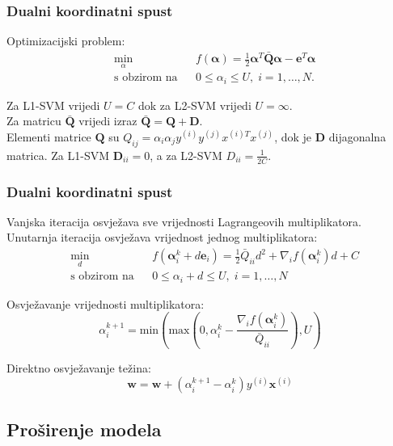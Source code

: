\documentclass[utf8]{beamer}
\newcommand{\iteralpha}{\boldsymbol{\alpha}_i^{k}}
\begin{document}
\begin{frame}
\frametitle{Dualni koordinatni spust}
Optimizacijski problem:
\begin{equation*}
\begin{aligned}
& \underset{\alpha}{\text{min}}
& & f(\boldsymbol{\alpha}) = \frac{1}{2}\boldsymbol{\alpha}^T\bar{\textbf{Q}}\boldsymbol{\alpha} 
- \textbf{e}^T\boldsymbol{\alpha}\\
& \text{s obzirom na}
& & 0 \leq \alpha_i \leq U, \; i = 1, \ldots, N.
\end{aligned}
\end{equation*}

Za L1-SVM vrijedi $U=C$ dok za L2-SVM vrijedi $U=\infty$. \\
Za matricu $\bar{\textbf{Q}}$ vrijedi izraz $\bar{\textbf{Q}} = \textbf{Q} + \textbf{D}$.\\
Elementi matrice $\textbf{Q}$ su $Q_{ij} = \alpha_i\alpha_jy^{(i)}y^{(j)}x^{(i)T}x^{(j)}$, dok je $\textbf{D}$ dijagonalna matrica.  
Za L1-SVM $\textbf{D}_{ii} = 0$, a za L2-SVM $D_{ii} = \frac{1}{2C}$.
\end{frame}

\begin{frame}
\frametitle{Dualni koordinatni spust}
Vanjska iteracija osvježava sve vrijednosti Lagrangeovih multiplikatora.
Unutarnja iteracija osvježava vrijednost jednog multiplikatora:
\begin{equation*} 
\begin{aligned}
& \underset{d}{\text{min}}
& & f(\iteralpha + d\textbf{e}_i) = \frac{1}{2}\bar{Q}_{ii}d^2 + 
\nabla_if(\iteralpha)d + C\\
& \text{s obzirom na}
& & 0 \leq \alpha_i + d \leq U, \; i = 1, \ldots, N
\end{aligned}
\end{equation*}

Osvježavanje vrijednosti multiplikatora:
\begin{equation*}
  \alpha_i^{k+1} = \text{min}(\text{max}(0, \alpha_i^{k} - \frac{\nabla_if(\iteralpha)}{\bar{Q}_{ii}}), U)
\end{equation*}

Direktno osvježavanje težina:
\begin{equation*} 
  \textbf{w} = \textbf{w} +  (\alpha_i^{k + 1} - \alpha_i^{k}) y^{(i)}\textbf{x}^{(i)}
\end{equation*}
\end{frame}

\subsection{Proširenje modela}
\end{document}
